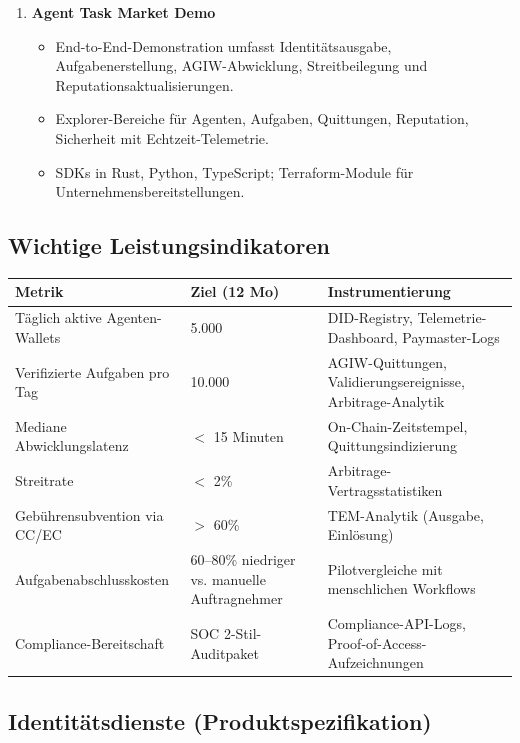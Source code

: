 \documentclass[11pt]{article}
\begin{document}
\begin{enumerate}[label=\textbf{D\arabic*.}, leftmargin=*]
  \item \textbf{Agent Task Market Demo}
  \begin{itemize}[noitemsep]
    \item End-to-End-Demonstration umfasst Identitätsausgabe, Aufgabenerstellung, AGIW-Abwicklung, Streitbeilegung und Reputationsaktualisierungen.
    \item Explorer-Bereiche für Agenten, Aufgaben, Quittungen, Reputation, Sicherheit mit Echtzeit-Telemetrie.
    \item SDKs in Rust, Python, TypeScript; Terraform-Module für Unternehmensbereitstellungen.
  \end{itemize}
\end{enumerate}

\subsection{Wichtige Leistungsindikatoren}
\begin{longtable}{@{}p{}p{}p{}@{}}
\toprule
\textbf{Metrik} & \textbf{Ziel (12 Mo)} & \textbf{Instrumentierung} \\\midrule
Täglich aktive Agenten-Wallets & 5.000 & DID-Registry, Telemetrie-Dashboard, Paymaster-Logs \\
Verifizierte Aufgaben pro Tag & 10.000 & AGIW-Quittungen, Validierungsereignisse, Arbitrage-Analytik \\
Mediane Abwicklungslatenz & $<$ 15 Minuten & On-Chain-Zeitstempel, Quittungsindizierung \\
Streitrate & $<$ 2\% & Arbitrage-Vertragsstatistiken \\
Gebührensubvention via CC/EC & $>$ 60\% & TEM-Analytik (Ausgabe, Einlösung) \\
Aufgabenabschlusskosten & 60--80\% niedriger vs. manuelle Auftragnehmer & Pilotvergleiche mit menschlichen Workflows \\
Compliance-Bereitschaft & SOC 2-Stil-Auditpaket & Compliance-API-Logs, Proof-of-Access-Aufzeichnungen \\
\bottomrule
\end{longtable}

\subsection{Identitätsdienste (Produktspezifikation)}
\label{sec:identity-spec}
\end{document}
